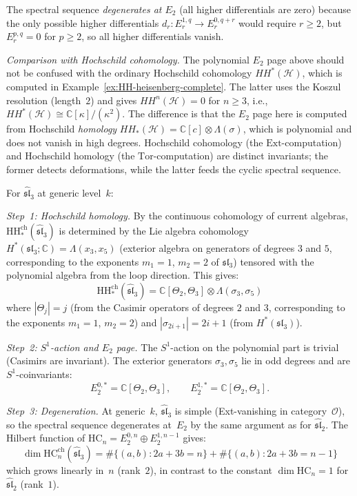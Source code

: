 \begin{example}
The spectral sequence \emph{degenerates at $E_2$} (all higher differentials are zero)
because the only possible higher differentials $d_r: E_r^{1,q} \to E_r^{0,q+r}$ would require $r \geq 2$, but $E_r^{p,q} = 0$ for $p \geq 2$, so all higher differentials vanish.

\emph{Comparison with Hochschild cohomology.}
The polynomial $E_2$ page above should not be confused with the ordinary Hochschild cohomology $HH^*(\mathcal{H})$, which is computed in Example~\ref{ex:HH-heisenberg-complete}.  The latter uses the Koszul resolution (length~$2$) and gives $HH^n(\mathcal{H}) = 0$ for $n \geq 3$, i.e., $HH^*(\mathcal{H}) \cong \mathbb{C}[\kappa]/(\kappa^2)$.  The difference is that the $E_2$ page here is computed from Hochschild \emph{homology} $HH_*(\mathcal{H}) = \mathbb{C}[c] \otimes \Lambda(\sigma)$, which is polynomial and does not vanish in high degrees.  Hochschild cohomology (the $\mathrm{Ext}$-computation) and Hochschild homology (the $\mathrm{Tor}$-computation) are distinct invariants; the former detects deformations, while the latter feeds the cyclic spectral sequence.
\end{example}

\begin{example}
\label{ex:E2-sl3}
For $\widehat{\mathfrak{sl}}_3$ at generic level~$k$:

\emph{Step~1: Hochschild homology.}
By the continuous cohomology of current algebras, $\mathrm{HH}_*^{\mathrm{ch}}(\widehat{\mathfrak{sl}}_3)$ is determined by the Lie algebra cohomology $H^*(\mathfrak{sl}_3; \mathbb{C}) = \Lambda(x_3, x_5)$ (exterior algebra on generators of degrees $3$ and $5$, corresponding to the exponents $m_1 = 1$, $m_2 = 2$ of $\mathfrak{sl}_3$) tensored with the polynomial algebra from the loop direction.  This gives:
\[\mathrm{HH}_*^{\mathrm{ch}}(\widehat{\mathfrak{sl}}_3)
= \mathbb{C}[\Theta_2, \Theta_3] \otimes \Lambda(\sigma_3, \sigma_5)\]
where $|\Theta_j| = j$ (from the Casimir operators of degrees $2$ and $3$, corresponding to the exponents $m_1 = 1$, $m_2 = 2$) and $|\sigma_{2i+1}| = 2i+1$ (from $H^*(\mathfrak{sl}_3)$).

\emph{Step~2: $S^1$-action and $E_2$ page.}
The $S^1$-action on the polynomial part is trivial (Casimirs are invariant).
The exterior generators $\sigma_3, \sigma_5$ lie in odd degrees and are
$S^1$-coinvariants:
\[E_2^{0,*} = \mathbb{C}[\Theta_2, \Theta_3], \qquad
E_2^{1,*} = \mathbb{C}[\Theta_2, \Theta_3].\]

\emph{Step~3: Degeneration.}
At generic~$k$, $\widehat{\mathfrak{sl}}_3$ is simple (Ext-vanishing in
category~$\mathcal{O}$), so the spectral sequence degenerates at~$E_2$ by
the same argument as for $\widehat{\mathfrak{sl}}_2$.  The Hilbert function
of $\mathrm{HC}_n = E_2^{0,n} \oplus E_2^{1,n-1}$ gives:
\[\dim \mathrm{HC}_n^{\mathrm{ch}}(\widehat{\mathfrak{sl}}_3)
= \#\{(a,b) : 2a + 3b = n\} + \#\{(a,b) : 2a + 3b = n-1\}\]
which grows linearly in~$n$ (rank~$2$), in contrast to the constant
$\dim \mathrm{HC}_n = 1$ for $\widehat{\mathfrak{sl}}_2$ (rank~$1$).
\end{example}

